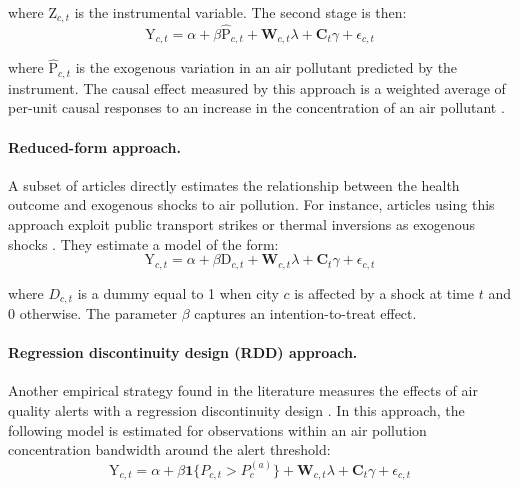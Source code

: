 \documentclass[12pt]{article}
\begin{document}
        \noindent where $\text{Z}_{c,t}$ is the instrumental variable. The second stage is then:
        ~
        \begin{equation}
        \text{Y}_{c,t} = \alpha + \beta\widehat{\text{P}}_{c,t} + \textbf{W}_{c,t}\lambda + \textbf{C}_{t}\gamma + \epsilon_{c,t}
        \end{equation}
        
        \noindent where $\widehat{\text{P}}_{c,t}$ is the exogenous variation in an air pollutant predicted by the instrument. The causal effect measured by this approach is a weighted average of per-unit causal responses to an increase in the concentration of an air pollutant \citep{angrist_two-stage_1995}.

        \paragraph{Reduced-form approach.} A subset of articles directly estimates the relationship between the health outcome and exogenous shocks to air pollution. For instance, articles using this approach exploit public transport strikes or thermal inversions as exogenous shocks \citep{bauernschuster_when_2017, jans_economic_2018, godzinski2019short, giaccherini_when_2021}. They estimate a model of the form:
        ~
        \begin{equation}
        \text{Y}_{c,t} = \alpha + \beta\text{D}_{c,t} + \textbf{W}_{c,t}\lambda + \textbf{C}_{t}\gamma + \epsilon_{c,t}
        \end{equation}
        
        \noindent where $D_{c,t}$ is a dummy equal to 1 when city $c$ is affected by a shock at time $t$ and 0 otherwise. The parameter $\beta$ captures an intention-to-treat effect.

        \begin{sloppypar}
        \paragraph{Regression discontinuity design (RDD) approach.} Another empirical strategy found in the literature measures the effects of air quality alerts with a regression discontinuity design \citep{chen_effect_2018, anderson_bounds_2022}. In this approach, the following model is estimated for observations within an air pollution concentration bandwidth around the alert threshold:
        ~
        \begin{equation}
        \text{Y}_{c,t} = \alpha + \beta \textbf{1}\{P_{c,t} > P^{(a)}_{c}\} + \textbf{W}_{c,t}\lambda + \textbf{C}_{t}\gamma + \epsilon_{c,t}
        \end{equation}
        \end{sloppypar}
        
\end{document}
